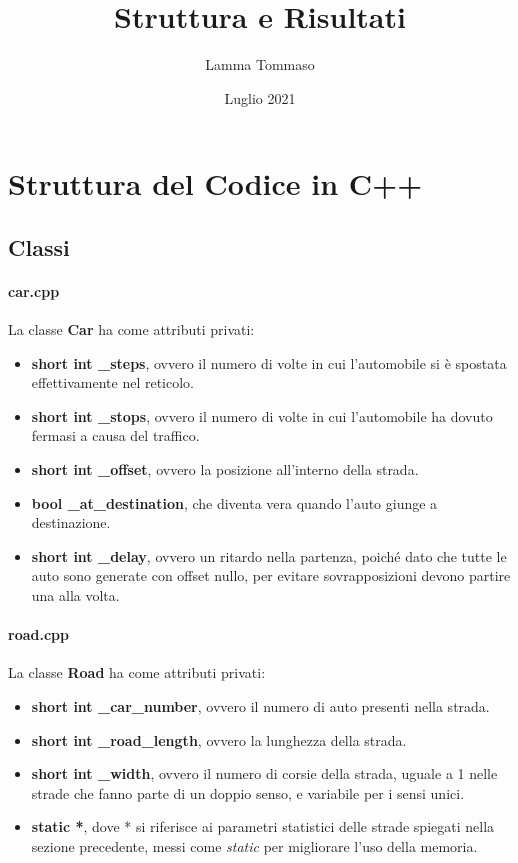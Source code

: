 \documentclass{article}
\title{Struttura e Risultati}
\author{ Lamma Tommaso}
\date{Luglio 2021}
\newcommand{\bb}[1]{\textbf{#1}}
\newcommand{\ii}[1]{\textit{#1}}
\begin{document}
\maketitle

\tableofcontents

\newpage

\section{Struttura del Codice in C++}

    \subsection{Classi}
        \paragraph{car.cpp}
            La classe \bb{Car} ha come attributi privati:
            \begin{itemize}
                \item \bb{short int \_steps}, ovvero il numero di volte in cui l'automobile si è spostata effettivamente nel reticolo.
                \item \bb{short int \_stops}, ovvero il numero di volte in cui l'automobile ha dovuto fermasi a causa del traffico.
                \item \bb{short int \_offset}, ovvero la posizione all'interno della strada.
                \item \bb{bool \_at\_destination}, che diventa vera quando l'auto giunge a destinazione.
                \item \bb{short int \_delay}, ovvero un ritardo nella partenza, poiché dato che tutte le auto
                    sono generate con offset nullo, per evitare sovrapposizioni devono partire una alla volta.
            \end{itemize}
        \paragraph{road.cpp}
            La classe \bb{Road} ha come attributi privati:
            \begin{itemize}
                \item \bb{short int \_car\_number}, ovvero il numero di auto presenti nella strada.
                \item \bb{short int \_road\_length}, ovvero la lunghezza della strada.
                \item \bb{short int \_width}, ovvero il numero di corsie della strada, uguale a 1 nelle strade che fanno parte di un doppio senso,
                    e variabile per i sensi unici.
                \item \bb{static *}, dove * si riferisce ai parametri statistici delle strade spiegati nella sezione precedente, messi come
                    \ii{static} per migliorare l'uso della memoria.
            \end{itemize}
\end{document}
